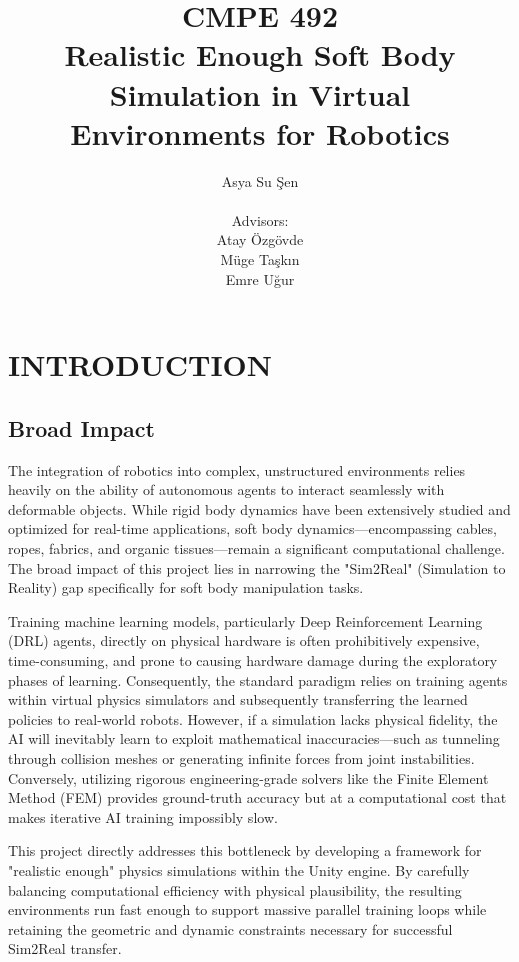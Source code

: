 \documentclass[a4paper,12pt]{report}
\begin{document}
\title{CMPE 492 \\ Realistic Enough Soft Body Simulation in Virtual Environments for Robotics}
\author{
Asya Su Şen \\ \\
Advisors: \\ 
Atay Özgövde \\
Müge Taşkın \\
Emre Uğur
}
\date{}
\maketitle{}
\tableofcontents

\chapter{INTRODUCTION}

\section{Broad Impact}
The integration of robotics into complex, unstructured environments relies heavily on the ability of autonomous agents to interact seamlessly with deformable objects. While rigid body dynamics have been extensively studied and optimized for real-time applications, soft body dynamics—encompassing cables, ropes, fabrics, and organic tissues—remain a significant computational challenge. The broad impact of this project lies in narrowing the "Sim2Real" (Simulation to Reality) gap specifically for soft body manipulation tasks. 

Training machine learning models, particularly Deep Reinforcement Learning (DRL) agents, directly on physical hardware is often prohibitively expensive, time-consuming, and prone to causing hardware damage during the exploratory phases of learning. Consequently, the standard paradigm relies on training agents within virtual physics simulators and subsequently transferring the learned policies to real-world robots. However, if a simulation lacks physical fidelity, the AI will inevitably learn to exploit mathematical inaccuracies—such as tunneling through collision meshes or generating infinite forces from joint instabilities. Conversely, utilizing rigorous engineering-grade solvers like the Finite Element Method (FEM) provides ground-truth accuracy but at a computational cost that makes iterative AI training impossibly slow. 

This project directly addresses this bottleneck by developing a framework for "realistic enough" physics simulations within the Unity engine. By carefully balancing computational efficiency with physical plausibility, the resulting environments run fast enough to support massive parallel training loops while retaining the geometric and dynamic constraints necessary for successful Sim2Real transfer. 
\end{document}
